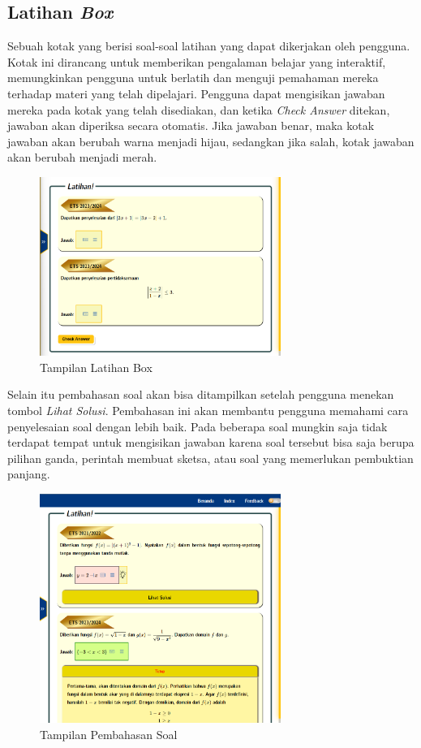 \documentclass{file/KP-ITS}
\theoremstyle{definition}
\theoremstyle{definition}
\theoremstyle{plain}
\begin{document}
\subsection{Latihan \textit{Box}}
Sebuah kotak yang berisi soal-soal latihan yang dapat dikerjakan oleh pengguna. Kotak ini dirancang untuk memberikan pengalaman belajar yang interaktif, memungkinkan pengguna untuk berlatih dan menguji pemahaman mereka terhadap materi yang telah dipelajari. Pengguna dapat mengisikan jawaban mereka pada kotak yang telah disediakan, dan ketika \textit{Check Answer} ditekan, jawaban akan diperiksa secara otomatis. Jika jawaban benar, maka kotak jawaban akan berubah warna menjadi hijau, sedangkan jika salah, kotak jawaban akan berubah menjadi merah.
\begin{figure}[h!]
  \centering
  \includegraphics[width=0.7\textwidth]{foto/LatihanBox.png}
  \caption{Tampilan Latihan Box}
\end{figure}

Selain itu pembahasan soal akan bisa ditampilkan setelah pengguna menekan tombol \textit{Lihat Solusi}. Pembahasan ini akan membantu pengguna memahami cara penyelesaian soal dengan lebih baik. Pada beberapa soal mungkin saja tidak terdapat tempat untuk mengisikan jawaban karena soal tersebut bisa saja berupa pilihan ganda, perintah membuat sketsa, atau soal yang memerlukan pembuktian panjang.
\begin{figure}[h!]
  \centering
  \includegraphics[width=0.7\textwidth]{foto/LihatSolusi.png}
  \caption{Tampilan Pembahasan Soal}
\end{figure}
\end{document}
